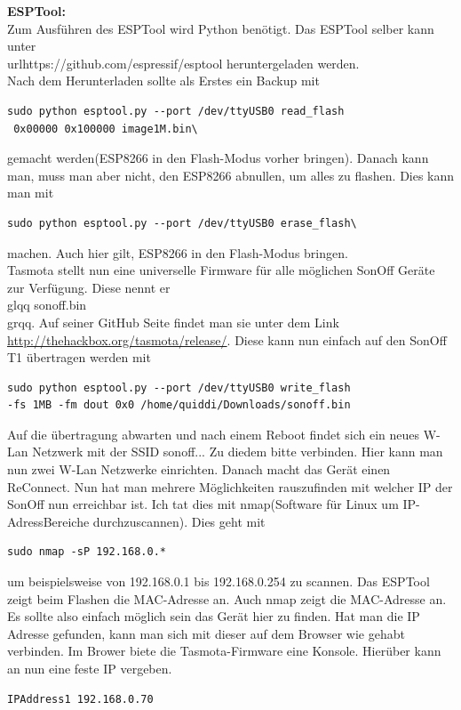 \documentclass[11pt,fleqn]{book} %
\numberwithin{equation}{section} %
\numberwithin{figure}{section} %
\numberwithin{table}{section} %
\begin{document}
\textbf{ESPTool:}\\
Zum Ausführen des ESPTool wird Python benötigt. Das ESPTool selber kann unter \\url{https://github.com/espressif/esptool} heruntergeladen werden.\\
Nach dem Herunterladen sollte als Erstes ein Backup mit
\begin{lstlisting}
sudo python esptool.py --port /dev/ttyUSB0 read_flash
 0x00000 0x100000 image1M.bin\
\end{lstlisting}
gemacht werden(ESP8266 in den Flash-Modus vorher bringen). Danach kann man, muss man aber nicht, den ESP8266 abnullen, um alles zu flashen. Dies kann man mit
\begin{lstlisting}
sudo python esptool.py --port /dev/ttyUSB0 erase_flash\
\end{lstlisting}
machen. Auch hier gilt, ESP8266 in den Flash-Modus bringen.\\
Tasmota stellt nun eine universelle Firmware für alle möglichen SonOff Geräte zur Verfügung. Diese nennt er \\glqq sonoff.bin\\grqq. Auf seiner GitHub Seite findet man sie unter dem Link \url{http://thehackbox.org/tasmota/release/}. Diese kann nun einfach auf den SonOff T1 übertragen werden mit
\begin{lstlisting}
sudo python esptool.py --port /dev/ttyUSB0 write_flash
-fs 1MB -fm dout 0x0 /home/quiddi/Downloads/sonoff.bin
\end{lstlisting}
Auf die übertragung abwarten und nach einem Reboot findet sich ein neues W-Lan Netzwerk mit der SSID sonoff... Zu diedem bitte verbinden. Hier kann man nun zwei W-Lan Netzwerke einrichten. Danach macht das Gerät einen ReConnect. Nun hat man mehrere Möglichkeiten rauszufinden mit welcher IP der SonOff nun erreichbar ist. Ich tat dies mit nmap(Software für Linux um IP-AdressBereiche durchzuscannen). Dies geht mit
\begin{lstlisting}
sudo nmap -sP 192.168.0.*
\end{lstlisting}
um beispielsweise von 192.168.0.1 bis 192.168.0.254 zu scannen. Das ESPTool zeigt beim Flashen die MAC-Adresse an. Auch nmap zeigt die MAC-Adresse an. Es sollte also einfach möglich sein das Gerät hier zu finden. Hat man die IP Adresse gefunden, kann man sich mit dieser auf dem Browser wie gehabt verbinden. Im Brower biete die Tasmota-Firmware eine Konsole. Hierüber kann an nun eine feste IP vergeben.
\begin{lstlisting}
IPAddress1 192.168.0.70
\end{lstlisting}
\end{document}
